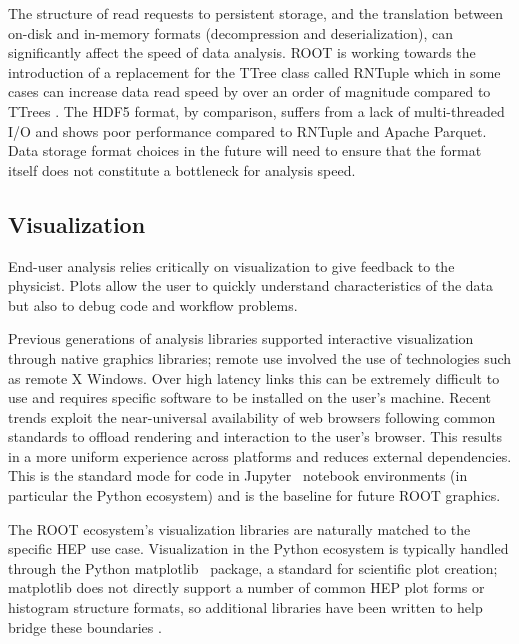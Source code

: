 The structure of read requests to persistent storage, and the translation between on-disk and in-memory formats (decompression and deserialization), can significantly affect the speed of data analysis. ROOT is working towards the introduction of a replacement for the TTree class called RNTuple \cite{Blomer:2020usr} which in some cases can increase data read speed by over an order of magnitude compared to TTrees \cite{Lopez-Gomez:2022umr}. The HDF5 format, by comparison, suffers from a lack of multi-threaded I/O and shows poor performance compared to RNTuple and Apache Parquet. Data storage format choices in the future will need to ensure that the format itself does not constitute a bottleneck for analysis speed.

\subsection{Visualization}

End-user analysis relies critically on visualization to give feedback to the physicist. Plots allow the user to quickly understand characteristics of the data but also to debug code and workflow problems.

Previous generations of analysis libraries supported interactive visualization through native graphics libraries; remote use involved the use of technologies such as remote X Windows. Over high latency links this can be extremely difficult to use and requires specific software to be installed on the user's machine. Recent trends exploit the near-universal availability of web browsers following common standards to offload rendering and interaction to the user's browser. This results in a more uniform experience across platforms and reduces external dependencies. This is the standard mode for code in Jupyter~\cite{soton403913} notebook environments (in particular the Python ecosystem) and is the baseline for future ROOT graphics.

The ROOT ecosystem's visualization libraries are naturally matched to the specific HEP use case. Visualization in the Python ecosystem is typically handled through the Python matplotlib~\cite{Hunter:2007} package, a standard for scientific plot creation; matplotlib does not directly support a number of common HEP plot forms or histogram structure formats, so additional libraries have been written to help bridge these boundaries \cite{mplhep, hist}.

